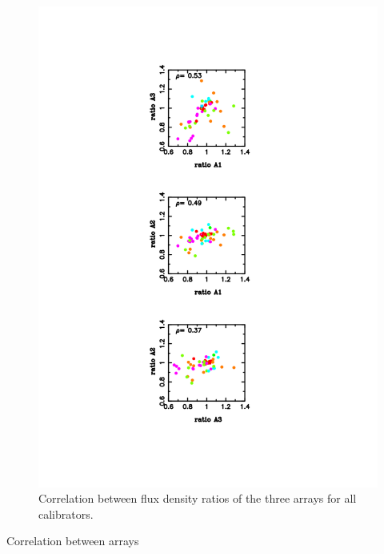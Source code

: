 \begin{figure}
  \includegraphics[clip, angle=0, scale=0.6]{Figures/correlation.pdf}
  \caption{Correlation between  flux density ratios of the three arrays for all calibrators.}
\label{fig:versus_all}
\end{figure}











Correlation between arrays







